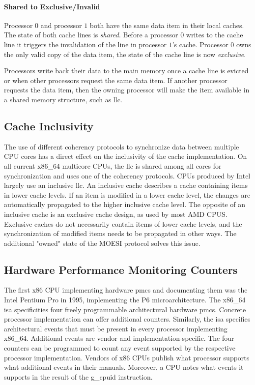 \paragraph{Shared to Exclusive/Invalid}
Processor $0$ and processor $1$ both have the same data item in their local
caches. The state of both cache lines is \textit{shared}. Before a  processor
$0$ writes to the cache line it triggers the invalidation of the line in
processor $1$'s cache. Processor $0$ owns the only valid copy of the data item,
the state of the cache line is now \textit{exclusive}.

Processors write back their data to the main memory once a cache line is evicted
or when other processors request the same data item. If another processor
requests the data item, then the owning processor will make the item available
in a shared memory structure, such as \gls{llc}.

\subsection{Cache Inclusivity}
\label{sec:state:technical:caches_inclusivity}
The use of different coherency protocols to synchronize data between multiple
CPU cores has a direct effect on the inclusivity of the cache implementation. On
all current x86\_64 multicore CPUs, the \gls{llc} is shared among all cores for
synchronization and uses one of the coherency protocols. CPUs produced by Intel
largely use an inclusive \gls{llc}. An inclusive cache describes a cache
containing items in lower cache levels. If an item is modified in a lower cache
level, the changes are automatically propagated to the higher inclusive cache
level. The opposite of an inclusive cache is an exclusive cache design, as used
by most AMD CPUS. Exclusive caches do not necessarily contain items of lower
cache levels, and the synchronization of modified items needs to be propagated
in other ways. The additional "owned" state of the MOESI protocol solves this
issue.

\subsection{Hardware Performance Monitoring Counters}
\label{sec:state:technical:hpc}
The first x86 CPU implementing hardware \glspl{pmc} and
documenting them was the Intel Pentium Pro in 1995, implementing the P6
microarchitecture.\cite{intel_sdm} The x86\_64 \gls{isa} specificities
four freely programmable architectural hardware
\glspl{pmc}.\cite{amd_manual} Concrete processor implementation can offer
additional counters. Similarly, the \gls{isa} specifies architectural
events that must be present in every processor implementing x86\_64. Additional
events are vendor and implementation-specific. The four counters can be
programmed to count any event supported by the respective processor
implementation. Vendors of x86 CPUs publish what processor supports what
additional events in their manuals. Moreover, a CPU notes what events it
supports in the result of the \gls{g_cpuid} instruction. \\

